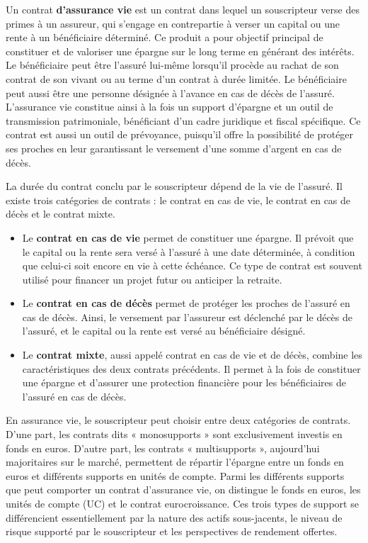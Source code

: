 Un contrat \textbf{d'assurance vie} est un contrat dans lequel un souscripteur verse des primes à un assureur, qui s'engage en contrepartie à verser un capital ou une rente à un bénéficiaire déterminé. Ce produit a pour objectif principal de constituer et de valoriser une épargne sur le long terme en générant des intérêts. Le bénéficiaire peut être l'assuré lui-même lorsqu'il procède au rachat de son contrat de son vivant ou au terme d'un contrat à durée limitée. Le bénéficiaire peut aussi être une personne désignée à l'avance en cas de décès de l'assuré. L'assurance vie constitue ainsi à la fois un support d'épargne et un outil de transmission patrimoniale, bénéficiant d'un cadre juridique et fiscal spécifique.
Ce contrat est aussi un outil de prévoyance, puisqu'il offre la possibilité de protéger ses proches en leur garantissant le versement d'une somme d'argent en cas de décès. 

La durée du contrat conclu par le souscripteur dépend de la vie de l'assuré. Il existe trois catégories de contrats : le contrat en cas de vie, le contrat en cas de décès et le contrat mixte.

\begin{itemize}
    \item Le \textbf{contrat en cas de vie} permet de constituer une épargne. Il prévoit que le capital ou la rente sera versé à l'assuré à une date déterminée, à condition que celui-ci soit encore en vie à cette échéance. Ce type de contrat est souvent utilisé pour financer un projet futur ou anticiper la retraite.
    \item Le \textbf{contrat en cas de décès} permet de protéger les proches de l'assuré en cas de décès. Ainsi, le versement par l'assureur est déclenché par le décès de l'assuré, et le capital ou la rente est versé au bénéficiaire désigné. 
    \item Le \textbf{contrat mixte}, aussi appelé contrat en cas de vie et de décès, combine les caractéristiques des deux contrats précédents. Il permet à la fois de constituer une épargne et d'assurer une protection financière pour les bénéficiaires de l'assuré en cas de décès.
\end{itemize}

En assurance vie, le souscripteur peut choisir entre deux catégories de contrats.  D'une part, les contrats dits « monosupports » sont exclusivement investis en fonds en euros. D'autre part, les contrats « multisupports », aujourd'hui majoritaires sur le marché, permettent de répartir l'épargne entre un fonds en euros et différents supports en unités de compte.
Parmi les différents supports que peut comporter un contrat d'assurance vie, on distingue le fonds en euros, les unités de compte (UC) et le contrat eurocroissance. Ces trois types de support se différencient essentiellement par la nature des actifs sous-jacents, le niveau de risque supporté par le souscripteur et les perspectives de rendement offertes.

